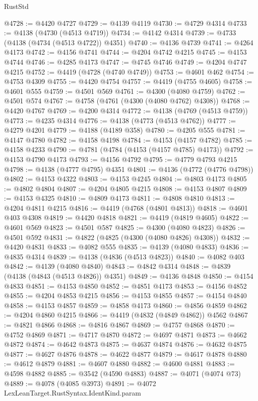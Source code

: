 \begin{lexlean}{RustStd}
\begin{coremodule}
@4728 := @4420 @4727
@4729 := @4139 @4119
@4730 := @4729 @4314
@4733 := @4138 (@4730 (@4513 @4719))
@4734 := @4142 @4314
@4739 := @4733 (@4138 (@4734 (@4513 @4722)) @4351)
@4740 := @4136 @4739
@4741 := @4264 @4173
@4742 := @4156 @4741
@4744 := @4204 @4742 @4215
@4745 := @4153 @4744
@4746 := @4285 @4173
@4747 := @4745 @4746
@4749 := @4204 @4747 @4215
@4752 := @4419 (@4728 (@4740 @4749))
@4753 := @4601 @462
@4754 := @4753 @4309
@4755 := @4420 @4754
@4757 := @4419 (@4755 @4605)
@4758 := @4601 @555
@4759 := @4501 @569
@4761 := @4300 (@4080 @4759)
@4762 := @4501 @574
@4767 := @4758 (@4761 (@4300 (@4080 @4762) @4308))
@4768 := @4420 @4767
@4769 := @4200 @4314
@4772 := @4138 (@4769 (@4513 @4759))
@4773 := @4235 @4314
@4776 := @4138 (@4773 (@4513 @4762))
@4777 := @4279 @4201
@4779 := @4188 (@4189 @358)
@4780 := @4205 @555
@4781 := @4147 @4780
@4782 := @4158 @4198
@4784 := @4153 (@4157 @4782)
@4785 := @4158 @4233
@4790 := @4781 (@4784 (@4153 (@4157 @4785) @4173))
@4792 := @4153 @4790 @4173
@4793 := @4156 @4792
@4795 := @4779 @4793 @4215
@4798 := @4138 (@4777 @4795) @4351
@4801 := @4136 (@4772 (@4776 @4798))
@4802 := @4153 @4322
@4803 := @4153 @4245
@4804 := @4803 @4173
@4805 := @4802 @4804
@4807 := @4204 @4805 @4215
@4808 := @4153 @4807
@4809 := @4153 @4325
@4810 := @4809 @4173
@4811 := @4808 @4810
@4813 := @4204 @4811 @4215
@4816 := @4419 (@4768 (@4801 @4813))
@4818 := @4601 @403 @4308
@4819 := @4420 @4818
@4821 := @4419 (@4819 @4605)
@4822 := @4601 @569
@4823 := @4501 @587
@4825 := @4300 (@4080 @4823)
@4826 := @4501 @592
@4831 := @4822 (@4825 (@4300 (@4080 @4826) @4308))
@4832 := @4420 @4831
@4833 := @4082 @555
@4835 := @4139 (@4080 @4833)
@4836 := @4835 @4314
@4839 := @4138 (@4836 (@4513 @4823))
@4840 := @4082 @403
@4842 := @4139 (@4080 @4840)
@4843 := @4842 @4314
@4848 := @4839 (@4138 (@4843 (@4513 @4826)) @4351)
@4849 := @4136 @4848
@4850 := @4154 @4833
@4851 := @4153 @4850
@4852 := @4851 @4173
@4853 := @4156 @4852
@4855 := @4204 @4853 @4215
@4856 := @4153 @4855
@4857 := @4154 @4840
@4858 := @4153 @4857
@4859 := @4858 @4173
@4860 := @4856 @4859
@4862 := @4204 @4860 @4215
@4866 := @4419 (@4832 (@4849 @4862)) @4562
@4867 := @4821 @4866
@4868 := @4816 @4867
@4869 := @4757 @4868
@4870 := @4752 @4869
@4871 := @4717 @4870
@4872 := @4697 @4871
@4873 := @4662 @4872
@4874 := @4642 @4873
@4875 := @4637 @4874
@4876 := @4632 @4875
@4877 := @4627 @4876
@4878 := @4622 @4877
@4879 := @4617 @4878
@4880 := @4612 @4879
@4881 := @4607 @4880
@4882 := @4600 @4881
@4883 := @4598 @4882
@4885 := @3542 (@4590 @4883)
@4887 := @4071 (@4074 @73)
@4889 := @4078 (@4085 @3973)
@4891 := @4072 LexLeanTarget.RustSyntax.IdentKind.param

\end{coremodule}
\end{lexlean}
